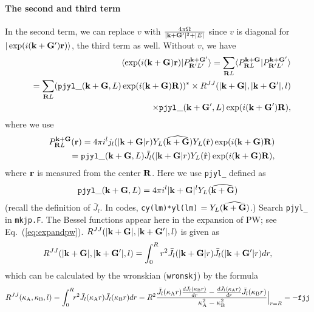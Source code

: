 \documentclass[a4paper,10pt,fleqn]{article}
\newcommand{\bfk}{{\bf k}}
\newcommand{\bfr}{{\bf r}}
\newcommand{\bfG}{{\bf G}}
\newcommand{\bfR}{{\bf R}}
\newcommand{\req}[1]{\mbox{Eq.~(\ref{#1})}}
\begin{document}
\paragraph{The second and third term}
In the second  term,
we can replace $v$ with $\frac{4 \pi \Omega}{|\bfk+\bfG'|^2+|E|}$
since $v$ is diagonal for $|\exp(i(\bfk+\bfG')\bfr) \rangle$, the third term as well. 
Without $v$, we have
\begin{eqnarray}
&&\langle \exp(i(\bfk+\bfG)\bfr)| P^{\bfk+\bfG'}_{\bfR'{L'}}\rangle
=\sum_{\bfR{L}} \langle 
P^{\bfk+\bfG}_{\bfR{L}}|
P^{\bfk+\bfG'}_{\bfR'{L'}}\rangle \nonumber \\
&&=\sum_{\bfR{L}} 
({\tt pjyl\_}(\bfk+\bfG,L) \exp(i(\bfk+\bfG)\bfR))^* 
\times R^{JJ}(|\bfk+\bfG|,|\bfk+\bfG'|,l) \nonumber \\
&&\times {\tt pjyl\_}(\bfk+\bfG',L) \exp(i(\bfk+\bfG')\bfR), \label{eq:fourvp0}
\end{eqnarray}
where we use 
\begin{eqnarray}
&&P^{\bfk+\bfG}_{\bfR{L}}(\bfr)=4 \pi i^l j_l(|{\bfk+\bfG}|r) 
Y_L(\widehat{\bfk+\bfG}) Y_L(\hat{\bfr})\exp(i(\bfk+\bfG)\bfR)\nonumber \\
&&= {\tt pjyl\_}(\bfk+\bfG,L) \bar{J}_l(|{\bfk+\bfG}|r) Y_L(\hat{\bfr})
\exp(i(\bfk+\bfG)\bfR), 
\end{eqnarray}
where $\bfr$ is measured from the center $\bfR$.
Here we use {\tt pjyl\_} defined as
\begin{eqnarray}
{\tt pjyl\_}(\bfk+\bfG,L) 
=4 \pi i^l |\bfk+\bfG|^l Y_L(\widehat{\bfk+\bfG}) \end{eqnarray}
(recall the definition of $\bar{J}_l$.
In codes, {\tt cy(lm)*yl(lm)}
$=Y_L(\widehat{\bfk+\bfG})$.)
Search {\tt pjyl\_} in {\tt mkjp.F}.
The Bessel functions appear here in the expansion of PW; see \req{eq:expandpw}.
$R^{JJ}(|\bfk+\bfG|,|\bfk+\bfG'|,l)$
is given as
\begin{eqnarray}
R^{JJ}(|\bfk+\bfG|,|\bfk+\bfG'|,l)
= \int_0^R  r^2 \bar{J}_l(|{\bfk+\bfG}|r)
\bar{J}_l(|{\bfk+\bfG'}|r) dr ,
\end{eqnarray}
which can be calculated by the wronskian ({\tt wronskj}) by the formula
\begin{eqnarray}
R^{JJ}(\kappa_{\rm A},\kappa_{\rm B},l)=
\int_0^R \!\!r^2 \bar{J}_l(\kappa_{\rm A} r)
\bar{J}_l(\kappa_{\rm B} r) dr
=R^2\frac{
\bar{J}_l(\kappa_{\rm A} r) \frac{d \bar{J}_l(\kappa_{\rm B} r)}{dr}
-\frac{d \bar{J}_l(\kappa_{\rm A} r)}{dr}\bar{J}_l(\kappa_{\rm B} r)
}{\kappa_{\rm A}^2-\kappa_{\rm B}^2}\Big|_{r=R}= {\tt -fjj}
\end{eqnarray}
\end{document}
